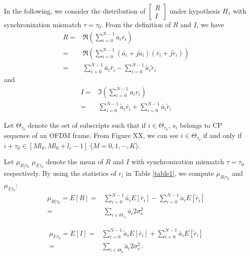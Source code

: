 In the following, we consider the distribution of $\begin{bmatrix}
  R \\
  I
\end{bmatrix}$ under hypothesis $H_1$ with synchronization mismatch $\tau = \tau_0$.
From the definition of $R$ and $I$, we have 
\begin{equation}
  \begin{split}
	R = &\Re{(\sum_{i=0}^{N-1} a_ir_i)}\\
	= &\Re(\sum_{i=0}^{N-1}(\bar{a}_i+j\tilde{a}_i)(\bar{r}_i+j\tilde{r}_i))\\
	= &\sum_{i=0}^{N-1}\bar{a}_i\bar{r}_i - \sum_{i=0}^{N-1}\tilde{a}_i\tilde{r}_i
  \end{split}
  \label{R}
\end{equation}
and
\begin{equation}
  \begin{split}
	I = &\Im(\sum_{i=0}^{N-1} a_ir_i)\\
	= &\sum_{i=0}^{N-1}\tilde{a}_i\bar{r}_i + \sum_{i=0}^{N-1}\bar{a}_i\tilde{r}_i
  \end{split}
  \label{I}
\end{equation}

Let $\Theta_{\tau_0}$ denote the set of subscripts such that if $i \in \Theta_{\tau_0}$,  $s_i$ belongs to  CP sequence of an OFDM frame.
From Figure XX, we can see $i \in \Theta_{\tau_0}$ if and only if $i + \tau_0 \in [Ml_0, Ml_0+l_c -1]$ ($M = 0, 1, \cdots, K$). 

Let $\mu_{R|\tau_0}$ $\mu_{I|\tau_0}$ denote the mean of $R$ and $I$ with synchronization mismatch $\tau=\tau_0$ respectively. By using the statistics of $r_i$ in Table \ref{table1}, we compute  $\mu_{R|\tau_0}$ and  $\mu_{I|\tau_0}$:
\begin{equation}
  \begin{split}
	\mu_{R|\tau_0} =  E[R] = &\sum_{i=0}^{N-1}\bar{a}_iE[\bar{r}_i] - \sum_{i=0}^{N-1}\tilde{a}_iE[\tilde{r}_i]\\
	= &\sum_{i\in\Theta_{\tau_0}}\bar{a}_i2\sigma_s^2
  \end{split}
  \label{ER}
\end{equation}

\begin{equation}
  \begin{split}
	\mu_{I|\tau_0} =  E[I] = &\sum_{i=0}^{N-1}\tilde{a}_iE[\bar{r}_i] + \sum_{i=0}^{N-1}\bar{a}_iE[\tilde{r}_i]\\
	= &\sum_{i\in\Theta_0}\tilde{a}_i2\sigma_s^2\,.
  \end{split}
  \label{EI}
\end{equation}

